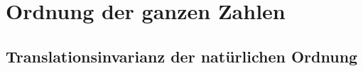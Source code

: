 \chapter{Ordnung der ganzen Zahlen}

\section{Translationsinvarianz der natürlichen Ordnung}

\par{}
\hypertarget{integers.statement.NaturalOrderTranslationForIntegers}{}
\par{}
\hypertarget{integers.proof.NaturalOrderTranslationForIntegers}{}
